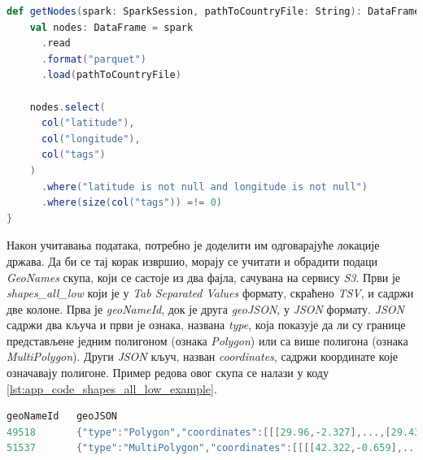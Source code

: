 \documentclass[12pt,oneside]{memoir}
\begin{document}
\begin{lstlisting}[caption={Функција која учитава податке и извршава иницијално филтрирање колона и редова}, language=Scala, label={lst:app_code_getNodes}]
def getNodes(spark: SparkSession, pathToCountryFile: String): DataFrame = {
    val nodes: DataFrame = spark
      .read
      .format("parquet")
      .load(pathToCountryFile)

    nodes.select(
      col("latitude"),
      col("longitude"),
      col("tags")
    )
      .where("latitude is not null and longitude is not null")
      .where(size(col("tags")) =!= 0)
}
\end{lstlisting}

Након учитавања података, потребно је доделити им одговарајуће локације држава. Да би се тај корак извршио, морају се учитати и обрадити подаци \textit{GeoNames} скупа, који се састоје из два фајла, сачувана на сервису \textit{S3}. Први је \textit{shapes\_all\_low} који је у \textit{Tab Separated Values} формату, скраћено \textit{TSV}, и садржи две колоне. Прва је \textit{geoNameId}, док је друга \textit{geoJSON}, у \textit{JSON} формату. \textit{JSON} садржи два кључа и први је ознака, названа \textit{type}, која показује да ли су границе представљене једним полигоном (ознака \textit{Polygon}) или са више полигона (ознака \textit{MultiPolygon}). Други \textit{JSON} кључ, назван \textit{coordinates}, садржи координате које означавају полигоне. Пример редова овог скупа се налази у коду \ref{lst:app_code_shapes_all_low_example}.

\begin{lstlisting}[caption={Упрошћени пример редова \textit{shapes\_all\_low} скупа}, language=Scala, label={lst:app_code_shapes_all_low_example}]
geoNameId	geoJSON
49518	    {"type":"Polygon","coordinates":[[[29.96,-2.327],...,[29.438,-2.798]]]}
51537	    {"type":"MultiPolygon","coordinates":[[[[42.322,-0.659],...,[43.451,11.491]]]]}
\end{lstlisting}
\end{document}
